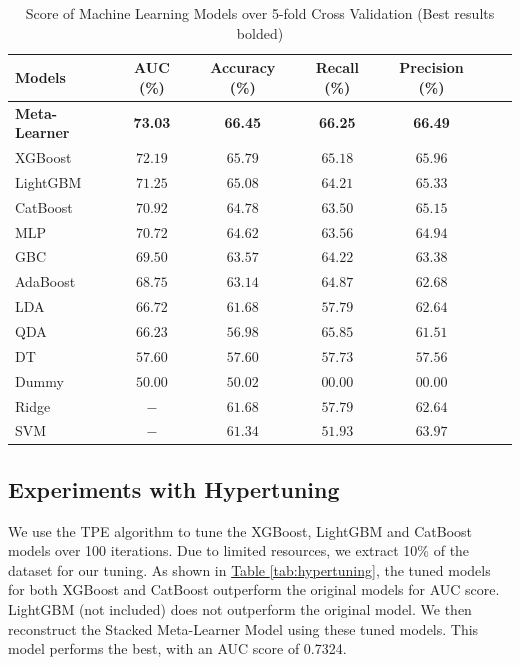 \documentclass[pdflatex,sn-basic,10pt]{sn-jnl}%
\newcommand{\reftable}[1]{\hyperref[#1]{Table \ref*{#1}}}
\begin{document}
\begin{table}[ht]
\centering
\caption{Score of Machine Learning Models over 5-fold Cross Validation (Best results bolded)}
\label{tab:allaimodels}
\begin{tabular}{@{}lcccccc@{}}
\toprule
 \textbf{Models} & \textbf{AUC (\%)} & \textbf{Accuracy (\%)} & \textbf{Recall (\%)}  & \textbf{Precision (\%)} \\ \midrule
\textbf{Meta-Learner} & \textbf{73.03} & \textbf{66.45} & \textbf{66.25} & \textbf{66.49} \\
XGBoost & $72.19$ & $65.79$ & $65.18$ & $65.96$ \\
LightGBM & $71.25$ & $65.08$ & $64.21$ & $65.33$ \\ 
CatBoost & $70.92$ & $64.78$ & $63.50$ & $65.15$ \\ 
MLP & $70.72$ & $64.62$ & $63.56$ & $64.94$ \\ 
GBC & $69.50$ & $63.57$ & $64.22$ & $63.38$ \\ 
AdaBoost & $68.75$ & $63.14$ & $64.87$ & $62.68$ \\ 
LDA & $66.72$ & $61.68$ & $57.79$ & $62.64$ \\ 
QDA & $66.23$ & $56.98$ & $65.85$ & $61.51$ \\ 
DT & $57.60$ & $57.60$ & $57.73$ & $57.56$ \\ 
Dummy & $50.00$ & $50.02$ & $00.00$ & $00.00$ \\ 
Ridge & $-$ & $61.68$ & $57.79$ & $62.64$ \\
SVM & $-$ & $61.34$ & $51.93$ & $63.97$ \\ \bottomrule
\end{tabular}%
\vspace{-1ex}
\end{table}

\subsection{Experiments with Hypertuning}\label{subsec:experiments-with-hypertuning}

We use the TPE algorithm to tune the XGBoost, LightGBM and CatBoost models over 100 iterations. Due to limited resources, we extract 10\% of the dataset for our tuning. As shown in \reftable{tab:hypertuning}, the tuned models for both XGBoost and CatBoost outperform the original models for AUC score. LightGBM (not included) does not outperform the original model. We then reconstruct the Stacked Meta-Learner Model using these tuned models. This model performs the best, with an AUC score of 0.7324.
\end{document}
